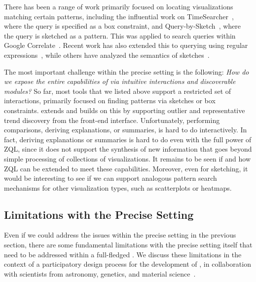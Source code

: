 There has been a range of work primarily focused on locating visualizations
matching certain patterns, including the influential work
on TimeSearcher~\cite{hochheiser2004dynamic}, where the query is
specified as a box constraint, and 
Query-by-Sketch~\cite{wattenberg2001sketching}, where the query is 
sketched as a pattern. 
This was applied to search queries within Google Correlate~\cite{mohebbi2011google}. 
Recent work has also extended this to querying using regular
expressions~\cite{Zgraggen2015}, while
others have analyzed the semantics
of sketches~\cite{correll2016semantics,Mannino2018}.

The most important challenge within the precise setting
is the following: {\em How do we expose the entire capabilities of
 \vidaql via intuitive interactions and discoverable
modules?} So far, most tools that we listed above
support a restricted set of interactions,
primarily focused on finding patterns via sketches or box constraints. 
\zv extends and builds on this 
by supporting outlier and representative trend discovery
from the front-end interface. 
Unfortunately, performing comparisons, deriving explanations, or summaries,
is hard to do interactively. 
In fact, deriving explanations or summaries
is hard to do even with the full power of ZQL, since
it does not support the synthesis of new information
that goes beyond simple processing of collections of visualizations. 
It remains to be seen if and how ZQL can be extended to meet these capabilities.
Moreover, even for sketching, it would be interesting to see if
we can support analogous pattern search mechanisms
for other visualization types, such
as scatterplots
or heatmaps.


\subsection{Limitations with the Precise Setting}
\par Even if we could address 
the issues within the precise setting
in the previous section,
there are some fundamental limitations
with the precise setting itself 
that need to be addressed within a full-fledged \vida.
We discuss these limitations
in the context of a participatory 
design process for the development 
of \zv, in collaboration
with scientists from astronomy, genetics, 
and material science~\cite{Lee2017}. 


